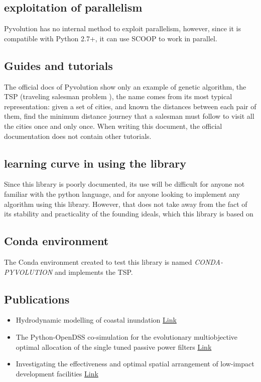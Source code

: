 \documentclass{article}
\begin{document}
\subsection{exploitation of parallelism}
Pyvolution has no internal method to exploit parallelism, however, since it is compatible with Python 2.7+, it can use SCOOP to work in parallel. 
\subsection{Guides and tutorials}
The official docs of Pyvolution show only an example of genetic algorithm, the TSP (traveling salesman problem ), the name comes from its most typical representation: given a set of cities, and known the distances between each pair of them, find the minimum distance journey that a salesman must follow to visit all the cities once and only once. When writing this document, the official documentation does not contain other tutorials.
\subsection{learning curve in using the library}
Since this library is poorly documented, its use will be difficult for anyone not familiar with the python language, and for anyone looking to implement any algorithm using this library. However, that does not take away from the fact of its stability and practicality of the founding ideals, which this library is based on
\subsection{Conda environment}
The Conda environment created to test this library is named \textit{CONDA-PYVOLUTION} and implements the TSP.
\subsection{Publications}
\begin{itemize}
    \item Hydrodynamic modelling of coastal inundation \href{https://www.researchgate.net/publication/264042269_Hydrodynamic_modelling_of_coastal_inundation}{Link}
    \item The Python-OpenDSS co-simulation for the evolutionary multiobjective optimal allocation of the single tuned passive power filters \href{https://ieeexplore.ieee.org/abstract/document/8188697}{Link}
    \item Investigating the effectiveness and optimal spatial arrangement of low-impact development facilities \href{https://www.sciencedirect.com/science/article/pii/S0022169419307280}{Link}
\end{itemize}
\end{document}
